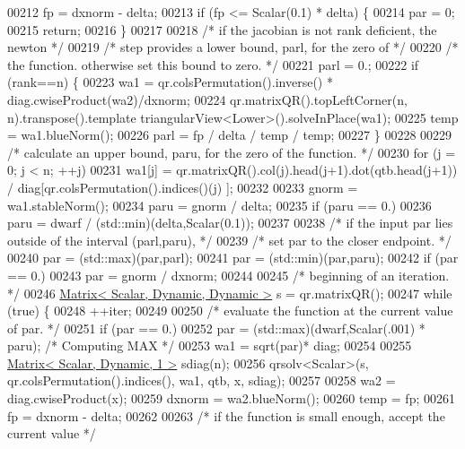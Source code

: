 \begin{DoxyCode}
00212     fp = dxnorm - delta;
00213     \textcolor{keywordflow}{if} (fp <= Scalar(0.1) * delta) \{
00214         par = 0;
00215         \textcolor{keywordflow}{return};
00216     \}
00217 
00218     \textcolor{comment}{/* if the jacobian is not rank deficient, the newton */}
00219     \textcolor{comment}{/* step provides a lower bound, parl, for the zero of */}
00220     \textcolor{comment}{/* the function. otherwise set this bound to zero. */}
00221     parl = 0.;
00222     \textcolor{keywordflow}{if} (rank==n) \{
00223         wa1 = qr.colsPermutation().inverse() *  diag.cwiseProduct(wa2)/dxnorm;
00224         qr.matrixQR().topLeftCorner(n, n).transpose().template triangularView<Lower>().solveInPlace(wa1);
00225         temp = wa1.blueNorm();
00226         parl = fp / delta / temp / temp;
00227     \}
00228 
00229     \textcolor{comment}{/* calculate an upper bound, paru, for the zero of the function. */}
00230     \textcolor{keywordflow}{for} (j = 0; j < n; ++j)
00231         wa1[j] = qr.matrixQR().col(j).head(j+1).dot(qtb.head(j+1)) / diag[qr.colsPermutation().indices()(j)
      ];
00232 
00233     gnorm = wa1.stableNorm();
00234     paru = gnorm / delta;
00235     \textcolor{keywordflow}{if} (paru == 0.)
00236         paru = dwarf / (std::min)(delta,Scalar(0.1));
00237 
00238     \textcolor{comment}{/* if the input par lies outside of the interval (parl,paru), */}
00239     \textcolor{comment}{/* set par to the closer endpoint. */}
00240     par = (std::max)(par,parl);
00241     par = (std::min)(par,paru);
00242     \textcolor{keywordflow}{if} (par == 0.)
00243         par = gnorm / dxnorm;
00244 
00245     \textcolor{comment}{/* beginning of an iteration. */}
00246     \hyperlink{group___core___module}{Matrix< Scalar, Dynamic, Dynamic >} s = qr.matrixQR();
00247     \textcolor{keywordflow}{while} (\textcolor{keyword}{true}) \{
00248         ++iter;
00249 
00250         \textcolor{comment}{/* evaluate the function at the current value of par. */}
00251         \textcolor{keywordflow}{if} (par == 0.)
00252             par = (std::max)(dwarf,Scalar(.001) * paru); \textcolor{comment}{/* Computing MAX */}
00253         wa1 = sqrt(par)* diag;
00254 
00255         \hyperlink{group___core___module}{Matrix< Scalar, Dynamic, 1 >} sdiag(n);
00256         qrsolv<Scalar>(s, qr.colsPermutation().indices(), wa1, qtb, x, sdiag);
00257 
00258         wa2 = diag.cwiseProduct(x);
00259         dxnorm = wa2.blueNorm();
00260         temp = fp;
00261         fp = dxnorm - delta;
00262 
00263         \textcolor{comment}{/* if the function is small enough, accept the current value */}

\end{DoxyCode}
